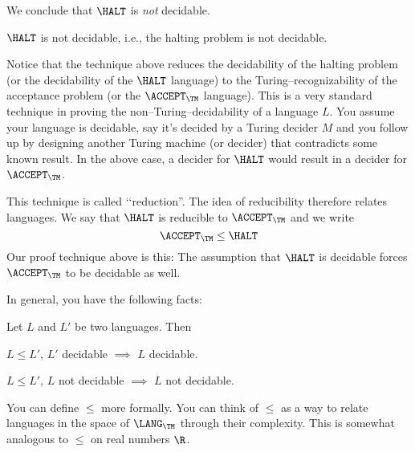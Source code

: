 We conclude that $\HALT$ is \textit{not} decidable.

\begin{thm}
$\HALT$ is not decidable, i.e., the halting problem is not decidable.
\end{thm}

Notice that the technique above reduces the decidability of 
the halting problem (or the decidability of the $\HALT$ language)
to the Turing--recognizability of the acceptance problem (or the
$\ACCEPT_\TM$ language).
This is a very standard technique in proving
the non--Turing--decidability of a 
language $L$.
You assume your language is decidable, say it's decided by a
Turing decider $M$ and you follow up by designing another Turing machine
(or decider) that contradicts some known result.
In the above case, a decider for $\HALT$ would result in a 
decider for $\ACCEPT_\TM$.

This technique is called \lq\lq reduction''.
The idea of reducibility therefore relates languages.
We say that $\HALT$ is reducible to $\ACCEPT_\TM$ and we write
\[
\ACCEPT_\TM \leq \HALT
\]
Our proof technique above is this:
The assumption that $\HALT$ is decidable forces $\ACCEPT_\TM$ to be
decidable as well.

In general, you have the following facts:

\begin{thm}
Let $L$ and $L'$ be two languages. Then
\begin{tightlist}
\item $L \leq L'$, $L'$ decidable $\implies$ $L$ decidable.
\item $L \leq L'$, $L$ not decidable $\implies$ $L$ not decidable.
\end{tightlist}
\end{thm}

You can define $\leq$ more formally.
You can think of $\leq$ as a way to relate
languages in the space of $\LANG_\TM$ through their complexity.
This is somewhat analogous to $\leq$ on real numbers $\R$. 
